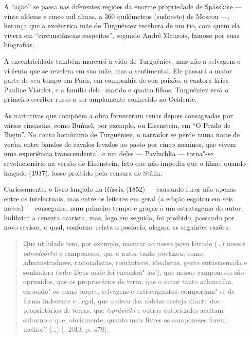 A ``ação'' se passa nas diferentes regiões da enorme propriedade de Spásskoie --- vinte aldeias e cinco mil almas, a 360 quilômetros (sudoeste) de Moscou ---, herança que a excêntrica mãe de Turguêniev recebera de um tio, com quem ela vivera em ``circunstâncias suspeitas'', segundo André Maurois, famoso por suas biografias.

A excentricidade também marcará a vida de Turguêniev, mas não a selvagem e violenta que se revelera em sua mãe, mas a sentimental. Ele passará a maior parte de seu tempo em Paris, em companhia de sua paixão, a cantora lírica Pauline Viardot, e a família dela: marido e quatro filhos. Turguêniev será o primeiro escritor russo a ser amplamente conhecido no
Ocidente.

As narrativas que compõem a obra forneceram cenas depois consagradas por vários cineastas, como Buñuel, por exemplo, ou Eisenstein, em ``O Prado de Biejin''. No conto homônimo de Turguêniev, o narrador se perde numa noite de verão, entre bandos de cavalos levados ao pasto por cinco meninos, que vivem uma experiência transcendental, e um deles --- Pavluchka --- torna"-se revolucionário na versão de Eisenstein, fato que não impediu que o filme, quando lançado (1937), fosse proibido pela
censura de Stálin.

Curiosamente, o livro lançado na Rússia (1852) --- causando furor não apenas entre os intelectuais, mas entre os leitores em geral (a edição esgotou em seis meses) --- conseguira, num primeiro tempo e graças a um estratagema do autor, ludibriar a censura czarista, mas, logo em seguida, foi proibido, passando por novo revisor, o qual, conforme relata o posfácio, alegara as seguintes razões:

\begin{quotation}
Que utilidade tem, por exemplo, mostrar ao nosso povo letrado (\ldots{}) nossos \emph{odnodvórtsi} e camponeses, que o autor tanto poetizou, como administradores, racionalistas, românticos, idealistas, gente entusiasmada e sonhadora (sabe Deus onde foi encontrá"-los!), que nossos camponeses são oprimidos, que os proprietários de terra, que o autor tanto achincalha, expondo"-os como torpes, selvagens e extravagantes, comportam"-se de forma indecente e ilegal, que o clero das aldeias rasteja diante dos proprietários de terras, que \emph{isprávniki} e outras autoridades aceitam suborno e que, obviamente, quanto mais livres
os camponeses forem, melhor? (\ldots{}) (, 2013, p. 478).
\end{quotation}

